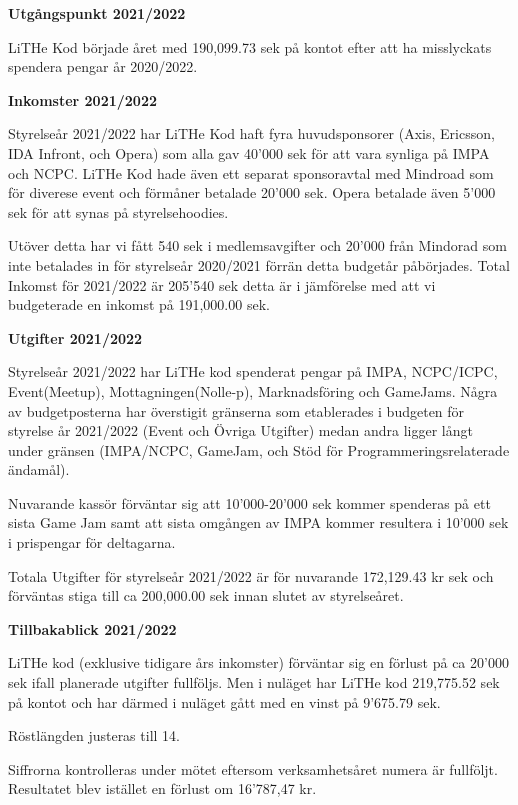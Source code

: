 \documentclass[a4paper]{article}
\newenvironment{quotationb}%
{\begin{leftbar}}%
{\end{leftbar}}
\begin{document}
\begin{quotationb}

\textbf{Utgångspunkt 2021/2022}

LiTHe Kod började året med 190,099.73 sek på kontot efter att ha
misslyckats spendera pengar år 2020/2022.

\textbf{Inkomster 2021/2022}

Styrelseår 2021/2022 har LiTHe Kod haft fyra huvudsponsorer (Axis,
Ericsson, IDA Infront, och Opera) som alla gav 40'000 sek för att vara
synliga på IMPA och NCPC. LiTHe Kod hade även ett separat sponsoravtal
med Mindroad som för diverese event och förmåner betalade 20'000
sek. Opera betalade även 5'000 sek för att synas på styrelsehoodies.

Utöver detta har vi fått 540 sek i medlemsavgifter och 20'000 från
Mindorad som inte betalades in för styrelseår 2020/2021 förrän detta
budgetår påbörjades. Total Inkomst för 2021/2022 är 205'540 sek detta
är i jämförelse med att vi budgeterade en inkomst på 191,000.00 sek.

\textbf{Utgifter 2021/2022}

Styrelseår 2021/2022 har LiTHe kod spenderat pengar på IMPA,
NCPC/ICPC, Event(Meetup), Mottagningen(Nolle-p), Marknadsföring och
GameJams. Några av budgetposterna har överstigit gränserna som
etablerades i budgeten för styrelse år 2021/2022 (Event och Övriga
Utgifter) medan andra ligger långt under gränsen (IMPA/NCPC, GameJam,
och Stöd för Programmeringsrelaterade ändamål).

 Nuvarande kassör förväntar sig att 10'000-20'000 sek kommer spenderas
på ett sista Game Jam samt att sista omgången av IMPA kommer resultera
i 10'000 sek i prispengar för deltagarna.

Totala Utgifter för styrelseår 2021/2022 är för nuvarande 172,129.43
kr sek och förväntas stiga till ca 200,000.00 sek innan slutet av
styrelseåret.

\textbf{Tillbakablick 2021/2022}

LiTHe kod (exklusive tidigare års inkomster) förväntar sig en förlust
på ca 20'000 sek ifall planerade utgifter fullföljs. Men i nuläget
har LiTHe kod 219,775.52 sek på kontot och har därmed i nuläget gått
med en vinst på 9'675.79 sek.

\end{quotationb}

Röstlängden justeras till 14.

Siffrorna kontrolleras under mötet eftersom verksamhetsåret numera är fullföljt.
Resultatet blev istället en förlust om 16'787,47 kr.
\end{document}
